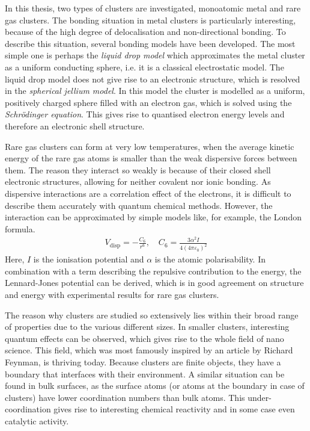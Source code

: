 In this thesis, two types of clusters are investigated, monoatomic metal
and rare gas clusters. The bonding situation in metal clusters is particularly
interesting, because of the high degree of delocalisation and non-directional
bonding. To describe this situation, several bonding models have been developed.
The most simple one is perhaps the \emph{liquid drop model} which approximates
the metal cluster as a uniform conducting sphere, i.e. it is a classical
electrostatic model. The liquid drop model does not give rise to an electronic
structure, which is resolved in the \textit{spherical jellium model}. In this
model the cluster is modelled as a uniform, positively charged sphere filled
with an electron gas, which is solved using the \textit{Schr\"odinger equation}.
This gives rise to quantised electron energy levels and therefore an electronic
shell structure.

Rare gas clusters can form at very low temperatures, when the average kinetic
energy of the rare gas atoms is smaller than the weak dispersive forces between
them. The reason they interact so weakly is because of their closed shell
electronic structures, allowing for neither covalent nor ionic bonding. As
dispersive interactions are a correlation effect of the electrons, it is
difficult to describe them accurately with quantum chemical methods. However,
the interaction can be approximated by simple models like, for example, the
London formula.
%
\begin{align}
    V_\text{disp}=-\frac{C_6}{r^6},\quad C_6=\frac{3\alpha^2I}{4\left(4\pi\varepsilon_0\right)^2}
\end{align}
Here, $I$ is the ionisation potential and $\alpha$ is the atomic polarisability.
In combination with a term describing the repulsive contribution to the energy,
the Lennard-Jones potential can be derived, which is in good agreement on
structure and energy with experimental results for rare gas clusters.

The reason why clusters are studied so extensively lies within their broad range
of properties due to the various different sizes. In smaller clusters,
interesting quantum effects can be observed, which gives rise to the whole field
of nano science. This field, which was most famously inspired by an article by
Richard Feynman,\autocite{Feynman_TherePlentyRoom_1960} is thriving today.
Because clusters are finite objects, they have a boundary that interfaces with
their environment. A similar situation can be found in bulk surfaces, as the
surface atoms (or atoms at the boundary in case of clusters) have lower
coordination numbers than bulk atoms. This under-coordination gives rise to
interesting chemical reactivity and in some case even catalytic activity.

